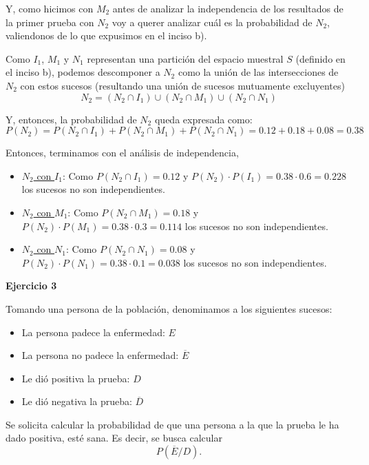 \documentclass[11pt]{article}
\begin{document}
Y, como hicimos con $M_{2}$ antes de analizar la independencia de los resultados de la primer prueba con $N_{2}$ voy a querer analizar cu\'al es la probabilidad de $N_{2}$, valiendonos de lo que expusimos en el inciso b). 

Como $I_{1}$, $M_{1}$ y $N_{1}$ representan una partici\'on del espacio muestral $S$ (definido en el inciso b), podemos descomponer a $N_{2}$ como la uni\'on de las intersecciones de $N_{2}$ con estos sucesos (resultando una uni\'on de sucesos mutuamente excluyentes)
\[N_{2} = (N_{2} \cap I_{1}) \cup (N_{2} \cap M_{1}) \cup (N_{2} \cap N_{1}) \]

Y, entonces, la probabilidad de $N_{2}$ queda expresada como: 
\[P(N_{2}) = P(N_{2} \cap I_{1}) + P(N_{2} \cap M_{1}) + P(N_{2} \cap N_{1}) = 0.12 + 0.18 + 0.08 = 0.38 \]

Entonces, terminamos con el an\'alisis de independencia,

\begin{itemize}
    \item \underline{$N_{2}$ con $I_{1}$}: Como $P(N_{2}\cap I_{1}) = 0.12$ y $P(N_{2})\cdot P(I_{1}) = 0.38\cdot 0.6 = 0.228$ los sucesos no son independientes. 
    \item \underline{$N_{2}$ con $M_{1}$}: Como $P(N_{2}\cap M_{1}) = 0.18$ y $P(N_{2})\cdot P(M_{1}) = 0.38\cdot 0.3 = 0.114$ los sucesos no son independientes. 
    \item \underline{$N_{2}$ con $N_{1}$}: Como $P(N_{2}\cap N_{1}) = 0.08$ y $P(N_{2})\cdot P(N_{1}) = 0.38\cdot 0.1 = 0.038$ los sucesos no son independientes. 
\end{itemize}

\textbf{Ejercicio 3}

Tomando una persona de la poblaci\'on, denominamos a los siguientes sucesos: 
\begin{itemize}
    \item La persona padece la enfermedad: $E$
    \item La persona no padece la enfermedad: $\overline{E}$
    \item Le di\'o positiva la prueba: $D$
    \item Le di\'o negativa la prueba: $\overline{D}$
\end{itemize}

Se solicita calcular la probabilidad de que una persona a la que la prueba le ha dado positiva, esté sana. Es decir, se busca calcular $$P(\overline{E}/D).$$
\end{document}
